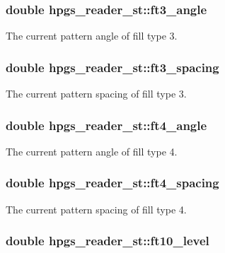 \subsubsection[ft3\_\-angle]{\setlength{\rightskip}{0pt plus 5cm}double {\bf hpgs\_\-reader\_\-st::ft3\_\-angle}}\label{structhpgs__reader__st_9856de831974f3500f7eb5462cce2faa}


The current pattern angle of fill type 3. 
\subsubsection[ft3\_\-spacing]{\setlength{\rightskip}{0pt plus 5cm}double {\bf hpgs\_\-reader\_\-st::ft3\_\-spacing}}\label{structhpgs__reader__st_916601d74af1abf7065a2d441851fa0e}


The current pattern spacing of fill type 3. 
\subsubsection[ft4\_\-angle]{\setlength{\rightskip}{0pt plus 5cm}double {\bf hpgs\_\-reader\_\-st::ft4\_\-angle}}\label{structhpgs__reader__st_40a2ac5fb645b3daf000d9b383a5850a}


The current pattern angle of fill type 4. 
\subsubsection[ft4\_\-spacing]{\setlength{\rightskip}{0pt plus 5cm}double {\bf hpgs\_\-reader\_\-st::ft4\_\-spacing}}\label{structhpgs__reader__st_28128eaea4f8510044d186406cc927df}


The current pattern spacing of fill type 4. 
\subsubsection[ft10\_\-level]{\setlength{\rightskip}{0pt plus 5cm}double {\bf hpgs\_\-reader\_\-st::ft10\_\-level}}\label{structhpgs__reader__st_37d720ec49a859770409af8e05301441}


